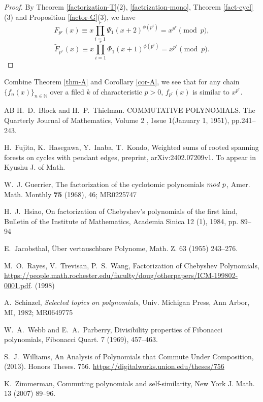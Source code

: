 \documentclass[a4paper, 11pt]{amsart}
\numberwithin{equation}{section}
\theoremstyle{definition}
\newcommand{\N}{\mathbb{N}}
\begin{document}
\begin{proof}
By Theorem \ref{factorization-T}(2), \eqref{factrization-mono}, Theorem \ref{fact-cycl}(3) and Proposition \ref{factor-G}(3), we have
\[
F_{p^r}(x)\equiv x \prod_{i=1}^r\Psi_1(x+2)^{\phi(p^i)}=x^{p^r}\pmod p,
\]
\[
\tilde{F}_{p^r}(x)\equiv x\prod_{i=1}^r\Phi_1(x+1)^{\phi(p^i)}=x^{p^r}\pmod p.
\]
\end{proof}

Combine Theorem \ref{thm-A} and Corollary \ref{cor-A}, we see that for any chain $\{f_n(x)\}_{n\in \N}$ over a filed $k$ of characteristic $p>0$, $f_{p^r}(x)$ is similar to $x^{p^r}$.

%
%
\begin{thebibliography}{AB}
 H.~D.~Block and H.~P.~Thielman. COMMUTATIVE  POLYNOMIALS. 
The  Quarterly Journal  of  Mathematics,  Volume 2 , Issue 1(January 1, 1951),  pp.241--243. 




H.~Fujita, K.~Hasegawa, Y.~Inaba, T.~Kondo, Weighted sums of rooted spanning forests on cycles with pendant edges,
preprint,
arXiv:2402.07209v1. To appear in Kyushu J. of Math.


W.~J. Guerrier, The factorization of the cyclotomic polynomials ${\rm mod}\ p$, Amer. Math. Monthly {\bf 75} (1968), 46; MR0225747

H.~J.~Hsiao, On factorization of Chebyshev's polynomials of the first kind,
Bulletin of the Institute of Mathematics, Academia Sinica 12 (1), 1984, pp. 89--
94

E.~Jacobsthal, \"Uber vertauschbare Polynome, Math. Z. 63 (1955) 243--276. 



M.~O.~Rayes, V.~Trevisan, P.~S.~Wang,  Factorization of  Chebyshev  Polynomials, 
\url{https://people.math.rochester.edu/faculty/doug/otherpapers/ICM-199802-0001.pdf}.
(1998)

A.~Schinzel, {\it Selected topics on polynomials}, Univ. Michigan Press, Ann Arbor, MI, 1982; MR0649775


W.~A.~Webb and E.~A.~Parberry, Divisibility properties of Fibonacci polynomials, Fibonacci Quart. 7 (1969), 457--463. 

S.~J.~Williams, An Analysis of Polynomials that Commute Under Composition, (2013). Honors Theses. 756.
\url{https://digitalworks.union.edu/theses/756} 


K.~Zimmerman, Commuting polynomials and self-similarity, New York J. Math. 13 (2007) 89--96.

\end{thebibliography}
\end{document}

